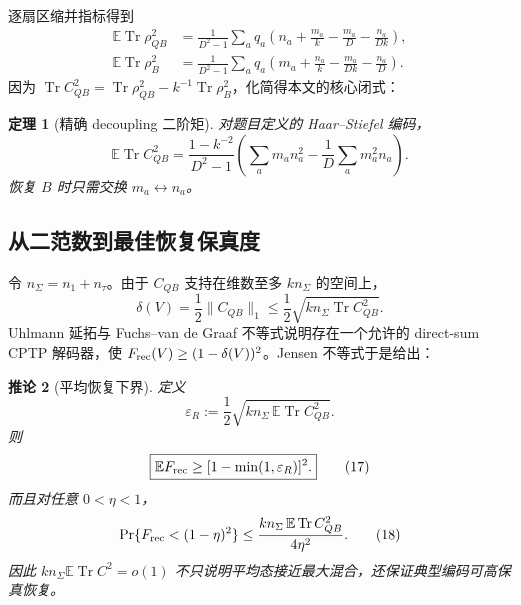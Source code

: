 \documentclass[UTF8,11pt,a4paper]{ctexart}
\newtheorem{theorem}{定理}[section]
\newtheorem{corollary}[theorem]{推论}
\theoremstyle{definition}
\newcommand{\Tr}{\operatorname{Tr}}
\newcommand{\E}{\mathbb E}
\newcommand{\norm}[1]{\lVert #1\rVert}
\begin{document}
逐扇区缩并指标得到
\begin{align}
\E\Tr\rho_{QB}^2
&=\frac1{D^2-1}\sum_aq_a\left(n_a+\frac{m_a}{k}
-\frac{m_a}{D}-\frac{n_a}{Dk}\right),                  \tag{13}\\
\E\Tr\rho_B^2
&=\frac1{D^2-1}\sum_aq_a\left(m_a+\frac{n_a}{k}
-\frac{m_a}{Dk}-\frac{n_a}{D}\right).                  \tag{14}
\end{align}
因为 $\Tr C_{QB}^2=\Tr\rho_{QB}^2-k^{-1}\Tr\rho_B^2$，化简得本文的核心闭式：

\begin{theorem}[精确 decoupling 二阶矩]
对题目定义的 Haar--Stiefel 编码，
\begin{equation}
\boxed{
\E\Tr C_{QB}^2=
\frac{1-k^{-2}}{D^2-1}
\left(\sum_am_an_a^2-\frac1D\sum_am_a^2n_a\right).}
                                                                    \tag{15}
\end{equation}
恢复 $B$ 时只需交换 $m_a\leftrightarrow n_a$。
\end{theorem}

\subsection{从二范数到最佳恢复保真度}

令 $n_\Sigma=n_1+n_\tau$。由于 $C_{QB}$ 支持在维数至多 $kn_\Sigma$ 的空间上，
\[
\delta(V)=\frac12\norm{C_{QB}}_1
\le\frac12\sqrt{kn_\Sigma\Tr C_{QB}^2}.
\]
Uhlmann 延拓与 Fuchs--van de Graaf 不等式说明存在一个允许的 direct-sum CPTP 解码器，使
$F_{\rm rec}(V)\ge(1-\delta(V))^2$。Jensen 不等式于是给出：

\begin{corollary}[平均恢复下界]
定义
\begin{equation}
\varepsilon_R:=\frac12\sqrt{kn_\Sigma\,\E\Tr C_{QB}^2}.
                                                                    \tag{16}
\end{equation}
则
\begin{equation}
\boxed{\E F_{\rm rec}\ge[1-\min(1,\varepsilon_R)]^2.}              \tag{17}
\end{equation}
而且对任意 $0<\eta<1$，
\begin{equation}
\Pr\{F_{\rm rec}<(1-\eta)^2\}
\le\frac{kn_\Sigma\,\E\Tr C_{QB}^2}{4\eta^2}.                    \tag{18}
\end{equation}
因此 $kn_\Sigma\E\Tr C^2=o(1)$ 不只说明平均态接近最大混合，还保证典型编码可高保真恢复。
\end{corollary}
\end{document}

